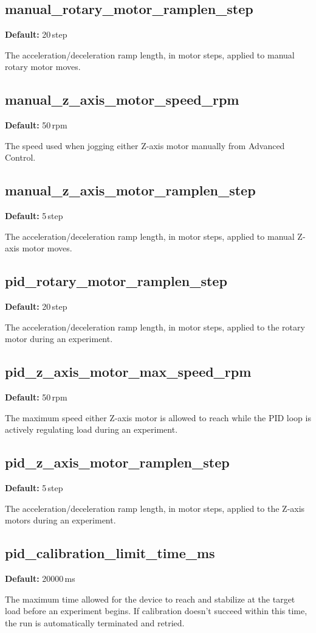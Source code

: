 \documentclass[12pt]{report}
\newcommand{\defaultval}[1]{\noindent\textbf{Default:} #1\par\smallskip\noindent}
\begin{document}
\subsection{manual\_rotary\_motor\_ramplen\_step}
\defaultval{20\,step}
The acceleration/deceleration ramp length, in motor steps, applied to manual rotary motor moves.

\subsection{manual\_z\_axis\_motor\_speed\_rpm}
\defaultval{50\,rpm}
The speed used when jogging either Z-axis motor manually from Advanced Control.

\subsection{manual\_z\_axis\_motor\_ramplen\_step}
\defaultval{5\,step}
The acceleration/deceleration ramp length, in motor steps, applied to manual Z-axis motor moves.

\subsection{pid\_rotary\_motor\_ramplen\_step}
\defaultval{20\,step}
The acceleration/deceleration ramp length, in motor steps, applied to the rotary motor during an experiment.

\subsection{pid\_z\_axis\_motor\_max\_speed\_rpm}
\defaultval{50\,rpm}
The maximum speed either Z-axis motor is allowed to reach while the PID loop is actively regulating load during an experiment.

\subsection{pid\_z\_axis\_motor\_ramplen\_step}
\defaultval{5\,step}
The acceleration/deceleration ramp length, in motor steps, applied to the Z-axis motors during an experiment.

\subsection{pid\_calibration\_limit\_time\_ms}
\defaultval{20000\,ms}
The maximum time allowed for the device to reach and stabilize at the target load before an experiment begins. If calibration doesn't succeed within this time, the run is automatically terminated and retried.
\end{document}
